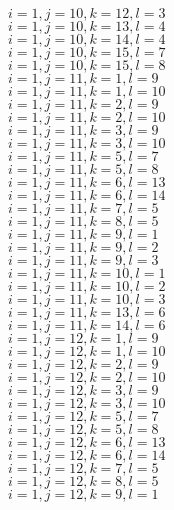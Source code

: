 \documentclass[14pt]{article}
\begin{document}
    $i=1,j=10,k=12,l=3 $ \\ 
    $i=1,j=10,k=13,l=4 $ \\ 
    $i=1,j=10,k=14,l=4 $ \\ 
    $i=1,j=10,k=15,l=7 $ \\ 
    $i=1,j=10,k=15,l=8 $ \\ 
    $i=1,j=11,k=1,l=9 $ \\ 
    $i=1,j=11,k=1,l=10 $ \\ 
    $i=1,j=11,k=2,l=9 $ \\ 
    $i=1,j=11,k=2,l=10 $ \\ 
    $i=1,j=11,k=3,l=9 $ \\ 
    $i=1,j=11,k=3,l=10 $ \\ 
    $i=1,j=11,k=5,l=7 $ \\ 
    $i=1,j=11,k=5,l=8 $ \\ 
    $i=1,j=11,k=6,l=13 $ \\ 
    $i=1,j=11,k=6,l=14 $ \\ 
    $i=1,j=11,k=7,l=5 $ \\ 
    $i=1,j=11,k=8,l=5 $ \\ 
    $i=1,j=11,k=9,l=1 $ \\ 
    $i=1,j=11,k=9,l=2 $ \\ 
    $i=1,j=11,k=9,l=3 $ \\ 
    $i=1,j=11,k=10,l=1 $ \\ 
    $i=1,j=11,k=10,l=2 $ \\ 
    $i=1,j=11,k=10,l=3 $ \\ 
    $i=1,j=11,k=13,l=6 $ \\ 
    $i=1,j=11,k=14,l=6 $ \\ 
    $i=1,j=12,k=1,l=9 $ \\ 
    $i=1,j=12,k=1,l=10 $ \\ 
    $i=1,j=12,k=2,l=9 $ \\ 
    $i=1,j=12,k=2,l=10 $ \\ 
    $i=1,j=12,k=3,l=9 $ \\ 
    $i=1,j=12,k=3,l=10 $ \\ 
    $i=1,j=12,k=5,l=7 $ \\ 
    $i=1,j=12,k=5,l=8 $ \\ 
    $i=1,j=12,k=6,l=13 $ \\ 
    $i=1,j=12,k=6,l=14 $ \\ 
    $i=1,j=12,k=7,l=5 $ \\ 
    $i=1,j=12,k=8,l=5 $ \\ 
    $i=1,j=12,k=9,l=1 $ \\ 
\end{document}
